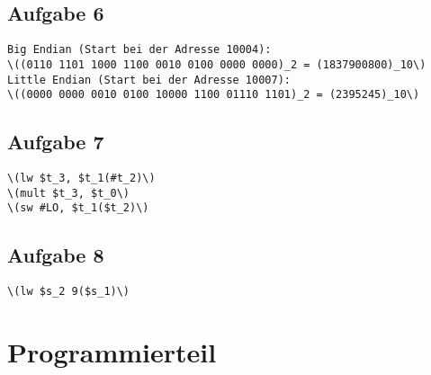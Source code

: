 \documentclass[a4paper,abstracton]{scrartcl}
\begin{document}
\subsection{Aufgabe 6}
\begin{lstlisting}[caption=Dezimalwert]
Big Endian (Start bei der Adresse 10004):
\((0110 1101 1000 1100 0010 0100 0000 0000)_2 = (1837900800)_10\)
Little Endian (Start bei der Adresse 10007):
\((0000 0000 0010 0100 10000 1100 01110 1101)_2 = (2395245)_10\)
\end{lstlisting}

\subsection{Aufgabe 7}
\begin{lstlisting}[caption=Assembler]
\(lw $t_3, $t_1(#t_2)\)
\(mult $t_3, $t_0\)
\(sw #LO, $t_1($t_2)\)
\end{lstlisting}

\subsection{Aufgabe 8}
\begin{lstlisting}[caption=Laden in Register]
\(lw $s_2 9($s_1)\)
\end{lstlisting}

\section{Programmierteil}

\newpage

\end{document}
